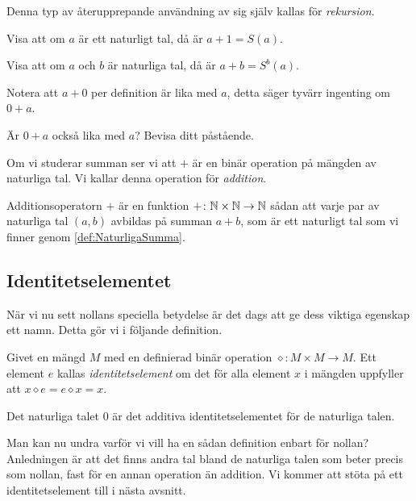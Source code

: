 Denna typ av återupprepande användning av sig själv kallas för
\emph{rekursion}.

\begin{exercise}
  Visa att om \(a\) är ett naturligt tal, då är \(a+1=S(a)\).
\end{exercise}
\begin{exercise}
  Visa att om \(a\) och \(b\) är naturliga tal, då är \(a+b=S^b(a)\).
\end{exercise}

Notera att \(a+0\) per definition är lika med \(a\), detta säger tyvärr
ingenting om \(0+a\).
\begin{exercise}
  Är \(0+a\) också lika med \(a\)?
  Bevisa ditt påstående.
\end{exercise}

Om vi studerar summan ser vi att \(+\) är en binär operation på mängden av
naturliga tal.
Vi kallar denna operation för \emph{addition}.
\begin{definition}[Addition]\label{def:NaturligaAddition}
  Additionsoperatorn \(+\) är en funktion \(+\colon\mathbb{N}\times\mathbb{N}\to\mathbb{N}\) sådan att
  varje par av naturliga tal \((a,b)\) avbildas på summan \(a+b\), som är
  ett naturligt tal som vi finner genom \cref{def:NaturligaSumma}.
\end{definition}



\subsection{Identitetselementet}
När vi nu sett nollans speciella betydelse är det dags att ge dess viktiga
egenskap ett namn.
Detta gör vi i följande definition.
\begin{definition}%
  Givet en mängd \(M\) med en definierad binär operation \(\diamond\colon 
  M\times M\to M\).
  Ett element \(e\) kallas \emph{identitetselement} om det för alla element
  \(x\) i mängden uppfyller att \(x\diamond e=e\diamond x=x\).
\end{definition}
\begin{example}
  Det naturliga talet \(0\) är det additiva identitetselementet för de
  naturliga talen.
\end{example}
Man kan nu undra varför vi vill ha en sådan definition enbart för nollan?
Anledningen är att det finns andra tal bland de naturliga talen som beter
precis som nollan, fast för en annan operation än addition.
Vi kommer att stöta på ett identitetselement till i nästa avsnitt.


